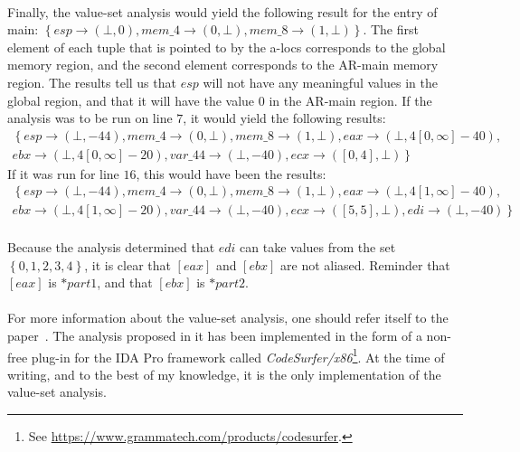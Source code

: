 \paragraph{}
Finally, the value-set analysis would yield the following result for the entry of main: $\left\{esp \rightarrow (\bot, 0), mem\_4 \rightarrow (0, \bot), mem\_8 \rightarrow (1, \bot)\right\}$. The first element of each tuple that is pointed to by the a-locs corresponds to the global memory region, and the second element corresponds to the AR-main memory region. The results tell us that $esp$ will not have any meaningful values in the global region, and that it will have the value $0$ in the AR-main region. If the analysis was to be run on line $7$, it would yield the following results: 
\begin{equation}
\begin{split}
\left\{ esp \rightarrow (\bot, -44), mem\_4 \rightarrow (0, \bot), mem\_8 \rightarrow (1, \bot), eax \rightarrow (\bot, 4[0,\infty ]-40), \right. \\
\left. ebx \rightarrow (\bot, 4[0,\infty ]-20), var\_44 \rightarrow (\bot, -40), ecx \rightarrow ([0, 4], \bot) \right\}
\end{split}
\end{equation}
If it was run for line $16$, this would have been the results:
\begin{equation}
\begin{split}
\left\{ esp \rightarrow (\bot, -44), mem\_4 \rightarrow (0, \bot), mem\_8 \rightarrow (1, \bot), eax \rightarrow (\bot, 4[1,\infty ]-40), \right. \\
\left. ebx \rightarrow (\bot, 4[1,\infty ]-20), var\_44 \rightarrow (\bot, -40), ecx \rightarrow ([5,5], \bot), edi \rightarrow (\bot, -40)\right\}
\end{split}
\end{equation}

\paragraph{}
Because the analysis determined that $edi$ can take values from the set $\left\{0, 1, 2, 3, 4\right\}$, it is clear that $[eax]$ and $[ebx]$ are not aliased. Reminder that $[eax]$ is $*part1$, and that $[ebx]$ is $*part2$.

\paragraph{}
For more information about the value-set analysis, one should refer itself to the paper~\cite{balakrishnan2004analyzing}. The analysis proposed in it has been implemented in the form of a non-free plug-in for the IDA Pro framework called \textit{CodeSurfer/x86}\footnote{See \url{https://www.grammatech.com/products/codesurfer}.}. At the time of writing, and to the best of my knowledge, it is the only implementation of the value-set analysis.

